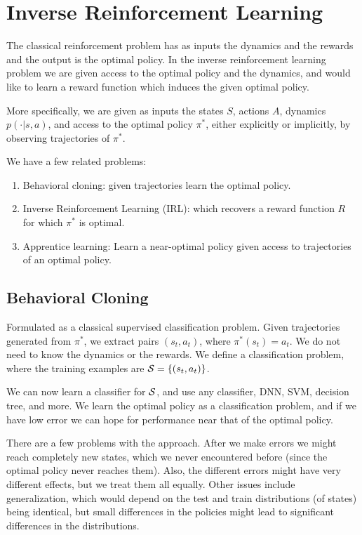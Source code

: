 \section{Inverse Reinforcement Learning}

The classical reinforcement problem has as inputs the dynamics and
the rewards and the output is the optimal policy. In the inverse
reinforcement learning problem we are given access to the optimal
policy and the dynamics, and would like to learn a reward function
which induces the given optimal policy.

More specifically, we are given as inputs the states $S$, actions
$A$, dynamics $p(\cdot|s,a)$, and access to the optimal policy
$\pi^*$, either explicitly or implicitly, by observing trajectories
of $\pi^*$.

We have a few related problems:
\begin{enumerate}
\item
Behavioral cloning: given trajectories learn the optimal policy.
\item
Inverse Reinforcement Learning (IRL): which recovers a reward
function $R$ for which $\pi^*$ is optimal.
\item
Apprentice learning: Learn a near-optimal policy given access to
trajectories of an optimal policy.
\end{enumerate}

\subsection{Behavioral Cloning}

Formulated as a classical supervised classification problem. Given
trajectories generated from $\pi^*$, we extract pairs $(s_t,a_t)$,
where $\pi^*(s_t)=a_t$. We do not need to know the dynamics or the
rewards. We define a classification problem, where the training
examples are ${\cal S}=\{(s_t,a_t)\}$.

We can now learn a classifier for ${\cal S}$, and use any
classifier, DNN, SVM, decision tree, and more. We learn the optimal
policy as a classification problem, and if we have low error we can
hope for performance near that of the optimal policy.

There are a few problems with the approach. After we make errors we
might reach completely new states, which we never encountered before
(since the optimal policy never reaches them). Also, the different
errors might have very different effects, but we treat them all
equally. Other issues include generalization, which would depend on
the test and train distributions (of states) being identical, but
small differences in the policies might lead to significant
differences in the distributions.


